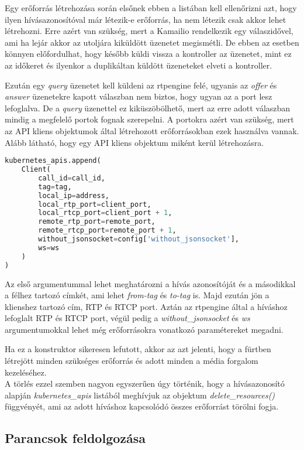 Egy erőforrás létrehozása során elsőnek ebben a listában kell ellenőrizni azt, hogy
ilyen hívásazonosítóval már létezik-e erőforrás, ha nem létezik csak akkor lehet létrehozni. 
Erre azért van szükség, mert a Kamailio rendelkezik egy válaszidővel, ami ha lejár
akkor az utoljára kiküldött üzenetet megismétli. De ebben az esetben könnyen előfordulhat,
hogy később küldi vissza a kontroller az üzenetet, mint ez az időkeret és ilyenkor 
a duplikáltan küldött üzeneteket elveti a kontroller.

Ezután egy \textit{query} üzenetet kell küldeni az rtpengine felé, ugyanis az 
\textit{offer} és \textit{answer} üzenetekre kapott válaszban nem biztos, hogy ugyan
az a port lesz lefoglalva. De a \textit{query} üzenettel ez kiküszöbölhető, mert az 
erre adott válaszban mindig a megfelelő portok fognak szerepelni. A portokra azért van
szükség, mert az API kliens objektumok által létrehozott erőforrásokban ezek használva
vannak. Alább látható, hogy egy API kliens objektum miként kerül létrehozásra.

\begin{lstlisting}[language=python, caption=Kubernetes API kliens objektum létrehozása, label=lst:kubeAPI]
kubernetes_apis.append(
	Client(
		call_id=call_id,
		tag=tag,
		local_ip=address,
		local_rtp_port=client_port,
		local_rtcp_port=client_port + 1,
		remote_rtp_port=remote_port,
		remote_rtcp_port=remote_port + 1,
		without_jsonsocket=config['without_jsonsocket'],
		ws=ws
	)
)
\end{lstlisting}

Az első argumentummal lehet meghatározni a hívás azonosítóját és a másodikkal a félhez
tartozó címkét, ami lehet \textit{from-tag} és \textit{to-tag} is. Majd ezután jön a
klienshez tartozó cím, RTP és RTCP port. Aztán az rtpengine által a híváshoz lefoglalt
RTP és RTCP port, végül pedig a \textit{without\_jsonsocket} és \textit{ws} argumentumokkal
lehet még erőforrásokra vonatkozó paramétereket megadni.

Ha ez a konstruktor sikeresen lefutott, akkor az azt jelenti, hogy a fürtben létrejött
minden szükséges erőforrás és adott minden a média forgalom kezeléséhez. \\

A törlés ezzel szemben nagyon egyszerűen úgy történik, hogy a hívásazonosító alapján
\textit{kubernetes\_apis} listából meghívjuk az objektum \textit{delete\_resources()}
függvényét, ami az adott híváshoz kapcsolódó összes erőforrást törölni fogja.

\subsection{Parancsok feldolgozása}

